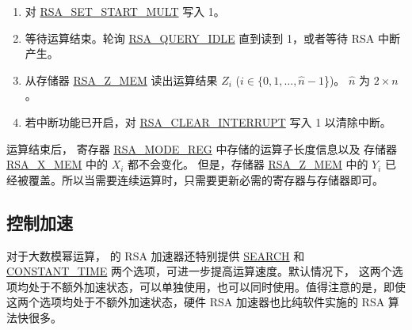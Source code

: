 \documentclass[main\_\_CN.tex]{subfiles}
\begin{document}
\begin{enumerate}
        只需要根据运算子长度，将这两个运算子中有效的数据写入存储器，没有使用到的存储器可以是任意值。
        
    \item 对 \hyperref[fielddesc:RSASETSTARTMULT]{RSA\_SET\_START\_MULT} 写入 1。

    \item 等待运算结束。轮询 \hyperref[fielddesc:RSAQUERYIDLE]{RSA\_QUERY\_IDLE} 直到读到 1，或者等待 RSA 中断产生。
    
    \item 从存储器 \hyperref[regdesc:RSAmemory]{RSA\_Z\_MEM} 读出运算结果 \begin{math}Z_{i}\end{math} (\begin{math}i \in \{ 0, 1, \dots, \hat{n}-1 \end{math}\})。
        \begin{math}\hat{n}\end{math} 为  \begin{math} 2 \times n \end{math} 。

    \item 若中断功能已开启，对 \hyperref[fielddesc:RSACLEARINTERRUPT]{RSA\_CLEAR\_INTERRUPT} 写入 1 以清除中断。

\end{enumerate}

运算结束后，
寄存器 \hyperref[regdesc:RSAMODEREG]{RSA\_MODE\_REG} 中存储的运算子长度信息以及
存储器 \hyperref[regdesc:RSAmemory]{RSA\_X\_MEM} 中的 \begin{math}{X}_{i}\end{math} 都不会变化。
但是，存储器 \hyperref[regdesc:RSAmemory]{RSA\_Z\_MEM} 中的 \begin{math}{Y}_{i}\end{math}
已经被覆盖。所以当需要连续运算时，只需要更新必需的寄存器与存储器即可。

\subsection{控制加速}\label{sec:Accelerate options}

对于大数模幂运算，\chipname{} 的 RSA 加速器还特别提供 \hyperref[regdesc:RSASEARCHENABLEREG]{SEARCH} 和 \hyperref[regdesc:RSACONSTANTTIMEREG]{CONSTANT\_TIME} 两个选项，可进一步提高运算速度。默认情况下， 这两个选项均处于不额外加速状态，可以单独使用，也可以同时使用。值得注意的是，即使这两个选项均处于不额外加速状态，硬件 RSA 加速器也比纯软件实施的 RSA 算法快很多。
\end{document}
